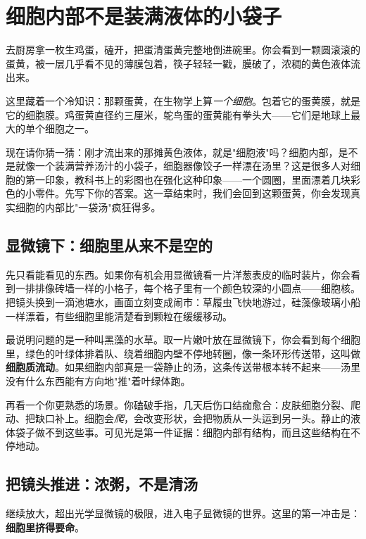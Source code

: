 \chapter{细胞内部不是装满液体的小袋子}

\begin{kaichang}
去厨房拿一枚生鸡蛋，磕开，把蛋清蛋黄完整地倒进碗里。你会看到一颗圆滚滚的蛋黄，被一层几乎看不见的薄膜包着，筷子轻轻一戳，膜破了，浓稠的黄色液体流出来。

这里藏着一个冷知识：那颗蛋黄，在生物学上算\emph{一个细胞}。包着它的蛋黄膜，就是它的细胞膜。鸡蛋黄直径约三厘米，鸵鸟蛋的蛋黄能有拳头大——它们是地球上最大的单个细胞之一。

现在请你猜一猜：刚才流出来的那摊黄色液体，就是"细胞液"吗？细胞内部，是不是就像一个装满营养汤汁的小袋子，细胞器像饺子一样漂在汤里？这是很多人对细胞的第一印象，教科书上的彩图也在强化这种印象——一个圆圈，里面漂着几块彩色的小零件。先写下你的答案。这一章结束时，我们会回到这颗蛋黄，你会发现真实细胞的内部比"一袋汤"疯狂得多。
\end{kaichang}

\section{显微镜下：细胞里从来不是空的}

先只看能看见的东西。如果你有机会用显微镜看一片洋葱表皮的临时装片，你会看到一排排像砖墙一样的小格子，每个格子里有一个颜色较深的小圆点——细胞核。把镜头换到一滴池塘水，画面立刻变成闹市：草履虫飞快地游过，硅藻像玻璃小船一样漂着，有些细胞里能清楚看到颗粒在缓缓移动。

最说明问题的是一种叫黑藻的水草。取一片嫩叶放在显微镜下，你会看到每个细胞里，绿色的叶绿体排着队、绕着细胞内壁不停地转圈，像一条环形传送带，这叫做\textbf{细胞质流动}。如果细胞内部真是一袋静止的汤，这条传送带根本转不起来——汤里没有什么东西能有方向地"推"着叶绿体跑。

再看一个你更熟悉的场景。你磕破手指，几天后伤口结痂愈合：皮肤细胞分裂、爬动、把缺口补上。细胞会\emph{爬}，会改变形状，会把物质从一头运到另一头。静止的液体袋子做不到这些事。可见光是第一件证据：细胞内部有结构，而且这些结构在不停地动。

\section{把镜头推进：浓粥，不是清汤}

继续放大，超出光学显微镜的极限，进入电子显微镜的世界。这里的第一冲击是：\textbf{细胞里挤得要命}。

